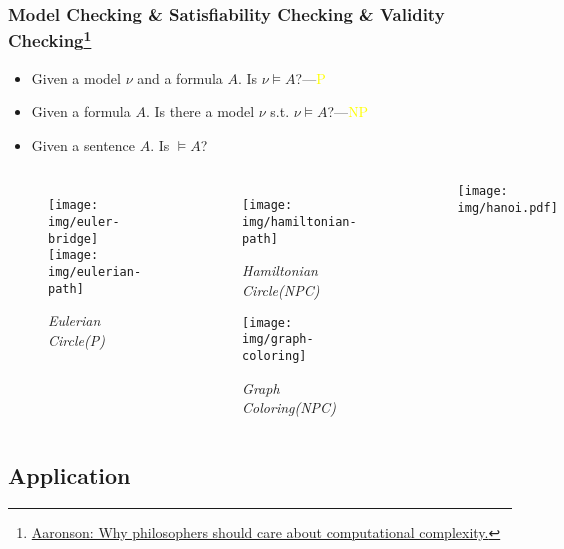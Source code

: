 \documentclass[UTF8,11pt,colorlinks,compress,openany]{beamer}%
\begin{document}
\begin{frame}\frametitle{\small Model Checking \& Satisfiability Checking \& Validity Checking\footnote{\tiny \href{https://www.scottaaronson.com/papers/philos.pdf}{Aaronson: Why philosophers should care about computational complexity.}}}
	\begin{itemize}
		\item Given a model $\nu$ and a formula $A$. Is $\nu\vDash A$?\hfill ---\textcolor{yellow}{P}
		\item Given a formula $A$. Is there a model $\nu$ s.t. $\nu\vDash A$?\hfill ---\textcolor{yellow}{NP}
		\item Given a sentence $A$. Is $\vDash A$?
	\end{itemize}
\begin{minipage}{\textwidth}
	\begin{columns}
			\begin{figure}
				\texttt{[image: img/euler-bridge]}\\
				\texttt{[image: img/eulerian-path]}\caption{\tiny{\textit{Eulerian Circle(P)}}}
			\end{figure}
		\vspace{-0.3cm}
			\begin{figure}
				\texttt{[image: img/hamiltonian-path]}\vspace{-0.2cm}\caption{\tiny{\textit{Hamiltonian Circle(NPC)}}}\vspace{-0.2cm}
				\texttt{[image: img/graph-coloring]}\vspace{-0.3cm}\caption{\tiny{\textit{Graph Coloring(NPC)}}}
			\end{figure}
		\vspace{-0.5cm}
			\begin{center}
				\begin{figure}
					\texttt{[image: img/hanoi.pdf]}
				\end{figure}
			\end{center}
	\end{columns}
\end{minipage}
\end{frame}

\subsection{Application}
\end{document}
